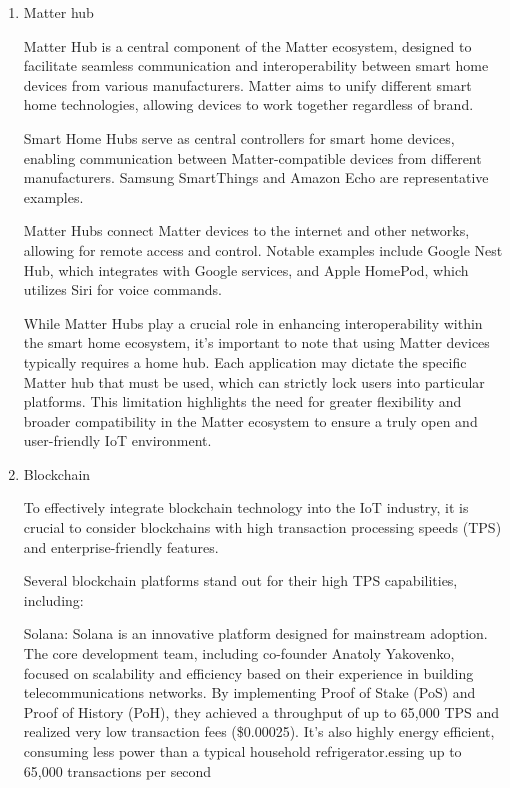 \documentclass[conference]{IEEEtran}
\begin{document}
\begin{enumerate}[itemsep=2ex, parsep=1ex]
	\item Matter hub
	      	      	          
	      Matter Hub is a central component of the Matter ecosystem, designed to facilitate seamless communication and interoperability between smart home devices from various manufacturers. Matter aims to unify different smart home technologies, allowing devices to work together regardless of brand.
	      	      	          
	      Smart Home Hubs serve as central controllers for smart home devices, enabling communication between Matter-compatible devices from different manufacturers. Samsung SmartThings and Amazon Echo are representative examples.
	      	      	          
	      Matter Hubs connect Matter devices to the internet and other networks, allowing for remote access and control. Notable examples include Google Nest Hub, which integrates with Google services, and Apple HomePod, which utilizes Siri for voice commands.
	      	      	          
	      While Matter Hubs play a crucial role in enhancing interoperability within the smart home ecosystem, it's important to note that using Matter devices typically requires a home hub. Each application may dictate the specific Matter hub that must be used, which can strictly lock users into particular platforms. This limitation highlights the need for greater flexibility and broader compatibility in the Matter ecosystem to ensure a truly open and user-friendly IoT environment.
	      	      	      
	\item Blockchain
	      	      	          
	      To effectively integrate blockchain technology into the IoT industry, it is crucial to consider blockchains with high transaction processing speeds (TPS) and enterprise-friendly features. 
	      	      	          
	      Several blockchain platforms stand out for their high TPS capabilities, including:
	      	      	          
	      Solana: Solana is an innovative platform designed for mainstream adoption. The core development team, including co-founder Anatoly Yakovenko, focused on scalability and efficiency based on their experience in building telecommunications networks. By implementing Proof of Stake (PoS) and Proof of History (PoH), they achieved a throughput of up to 65,000 TPS and realized very low transaction fees (\$0.00025). It's also highly energy efficient, consuming less power than a typical household refrigerator.essing up to 65,000 transactions per second
	      	      	       

\end{enumerate}
\end{document}
